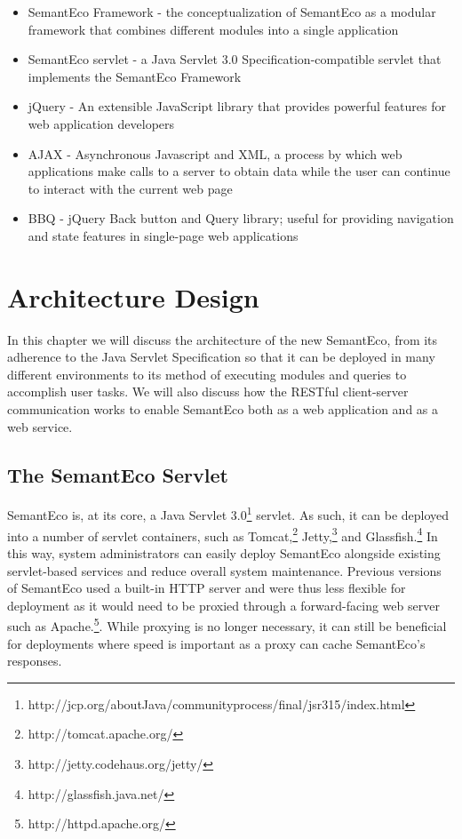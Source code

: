 \documentclass[letterpaper]{report}
\begin{document}
\begin{itemize}
\item SemantEco Framework - the conceptualization of SemantEco as a modular framework that combines different modules into a single application
\item SemantEco servlet - a Java Servlet 3.0 Specification-compatible servlet that implements the SemantEco Framework
\item jQuery - An extensible JavaScript library that provides powerful features for web application developers
\item AJAX - Asynchronous Javascript and XML, a process by which web applications make calls to a server to obtain data while the user can continue to interact with the current web page
\item BBQ - jQuery Back button and Query library; useful for providing navigation and state features in single-page web applications
\end{itemize}

\chapter{Architecture Design}
\label{architecture}
In this chapter we will discuss the architecture of the new SemantEco, from its adherence to the Java Servlet Specification so that it can be deployed in many different environments to its method of executing modules and queries to accomplish user tasks. We will also discuss how the RESTful client-server communication works to enable SemantEco both as a web application and as a web service.

\section{The SemantEco Servlet}
\label{servlet}
SemantEco is, at its core, a Java Servlet 3.0\footnote{http://jcp.org/aboutJava/communityprocess/final/jsr315/index.html} servlet. As such, it can be deployed into a number of servlet containers, such as Tomcat,\footnote{http://tomcat.apache.org/} Jetty,\footnote{http://jetty.codehaus.org/jetty/} and Glassfish.\footnote{http://glassfish.java.net/} In this way, system administrators can easily deploy SemantEco alongside existing servlet-based services and reduce overall system maintenance. Previous versions of SemantEco used a built-in HTTP server and were thus less flexible for deployment as it would need to be proxied through a forward-facing web server such as Apache.\footnote{http://httpd.apache.org/}. While proxying is no longer necessary, it can still be beneficial for deployments where speed is important as a proxy can cache SemantEco's responses.
\end{document}
